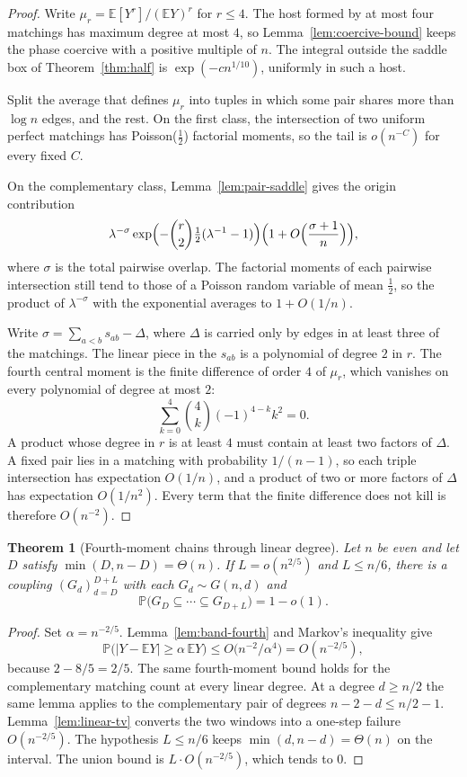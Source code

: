 \documentclass[11pt]{article}
\newtheorem{theorem}{Theorem}
\newcommand{\EE}{\mathbb{E}}
\newcommand{\PP}{\mathbb{P}}
\begin{document}
\begin{proof}
Write \(\mu_r=\EE[Y^r]/(\EE Y)^r\) for \(r\le 4\).
The host formed by at most four matchings has maximum degree at most \(4\), so Lemma~\ref{lem:coercive-bound} keeps the phase coercive with a positive multiple of \(n\).
The integral outside the saddle box of Theorem~\ref{thm:half} is \(\exp(-c n^{1/10})\), uniformly in such a host.

Split the average that defines \(\mu_r\) into tuples in which some pair shares more than \(\log n\) edges, and the rest.
On the first class, the intersection of two uniform perfect matchings has Poisson(\(\tfrac12\)) factorial moments, so the tail is \(o(n^{-C})\) for every fixed \(C\).

On the complementary class, Lemma~\ref{lem:pair-saddle} gives the origin contribution
\[
\lambda^{-\sigma}\exp\Bigl(-\binom{r}{2}\tfrac12(\lambda^{-1}-1)\Bigr)\Bigl(1+O\Bigl(\frac{\sigma+1}{n}\Bigr)\Bigr),
\]
where \(\sigma\) is the total pairwise overlap.
The factorial moments of each pairwise intersection still tend to those of a Poisson random variable of mean \(\tfrac12\), so the product of \(\lambda^{-\sigma}\) with the exponential averages to \(1+O(1/n)\).

Write \(\sigma=\sum_{a<b}s_{ab}-\Delta\), where \(\Delta\) is carried only by edges in at least three of the matchings.
The linear piece in the \(s_{ab}\) is a polynomial of degree \(2\) in \(r\).
The fourth central moment is the finite difference of order \(4\) of \(\mu_r\), which vanishes on every polynomial of degree at most \(2\):
\[
\sum_{k=0}^{4}\binom{4}{k}(-1)^{4-k}k^2=0.
\]
A product whose degree in \(r\) is at least \(4\) must contain at least two factors of \(\Delta\).
A fixed pair lies in a matching with probability \(1/(n-1)\), so each triple intersection has expectation \(O(1/n)\), and a product of two or more factors of \(\Delta\) has expectation \(O(1/n^2)\).
Every term that the finite difference does not kill is therefore \(O(n^{-2})\).
\end{proof}

\begin{theorem}[Fourth-moment chains through linear degree]
\label{thm:band-fourth-chains}
Let \(n\) be even and let \(D\) satisfy \(\min(D,n-D)=\Theta(n)\).
If \(L=o(n^{2/5})\) and \(L\le n/6\), there is a coupling \((G_d)_{d=D}^{D+L}\) with each \(G_d\sim G(n,d)\) and
\[
\PP\bigl(G_D\subseteq\cdots\subseteq G_{D+L}\bigr)=1-o(1).
\]
\end{theorem}

\begin{proof}
Set \(\alpha=n^{-2/5}\).
Lemma~\ref{lem:band-fourth} and Markov's inequality give
\[
\PP\bigl(|Y-\EE Y|\ge\alpha\,\EE Y\bigr)
\le
O\bigl(n^{-2}/\alpha^{4}\bigr)
=
O(n^{-2/5}),
\]
because \(2-8/5=2/5\).
The same fourth-moment bound holds for the complementary matching count at every linear degree.
At a degree \(d\ge n/2\) the same lemma applies to the complementary pair of degrees \(n-2-d\le n/2-1\).
Lemma~\ref{lem:linear-tv} converts the two windows into a one-step failure \(O(n^{-2/5})\).
The hypothesis \(L\le n/6\) keeps \(\min(d,n-d)=\Theta(n)\) on the interval.
The union bound is \(L\cdot O(n^{-2/5})\), which tends to \(0\).
\end{proof}
\end{document}
